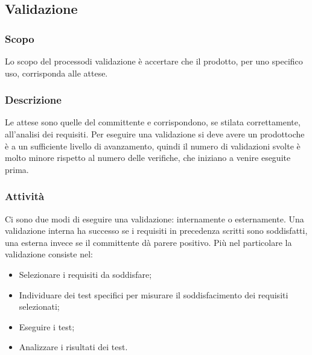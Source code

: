\subsection{Validazione}

\subsubsection{Scopo}
Lo scopo del processo\glosp di validazione è accertare che il prodotto\glo, per uno specifico uso, corrisponda alle attese.

\subsubsection{Descrizione}
Le attese sono quelle del committente e corrispondono, se stilata correttamente, all'analisi dei requisiti. 
Per eseguire una validazione si deve avere un prodotto\glosp che è a un sufficiente livello di avanzamento, quindi il numero di validazioni svolte è molto minore rispetto al numero delle verifiche, che iniziano a venire eseguite prima.

\subsubsection{Attività}
Ci sono due modi di eseguire una validazione: internamente o esternamente. Una validazione interna ha successo se i requisiti in precedenza scritti sono soddisfatti, una esterna invece se il committente dà parere positivo. Più nel particolare la validazione consiste nel:

\begin{itemize}
	\item Selezionare i requisiti da soddisfare;
	\item Individuare dei test specifici per misurare il soddisfacimento dei requisiti selezionati;
	\item Eseguire i test;
	\item Analizzare i risultati dei test.
\end{itemize}

